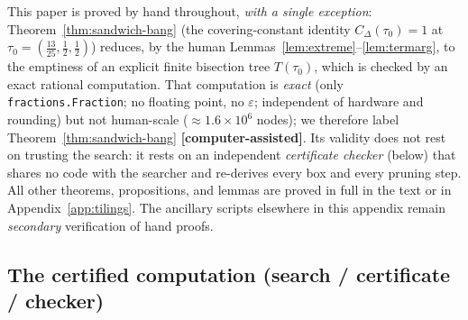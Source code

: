 
This paper is proved by hand throughout, \emph{with a single exception}:
Theorem~\ref{thm:sandwich-bang} (the covering-constant identity
$C_\Delta(\tau_0)=1$ at $\tau_0=(\tfrac{13}{25},\tfrac12,\tfrac12)$) reduces, by
the human Lemmas~\ref{lem:extreme}--\ref{lem:termarg}, to the emptiness of an
explicit finite bisection tree $T(\tau_0)$, which is checked by an exact
rational computation. That computation is \emph{exact} (only
\texttt{fractions.Fraction}; no floating point, no $\varepsilon$; independent of
hardware and rounding) but not human-scale ($\approx1.6\times10^6$ nodes); we
therefore label Theorem~\ref{thm:sandwich-bang} \textbf{[computer-assisted]}.
Its validity does not rest on trusting the search: it rests on an independent
\emph{certificate checker} (below) that shares no code with the searcher and
re-derives every box and every pruning step. All other theorems, propositions,
and lemmas are proved in full in the text or in Appendix~\ref{app:tilings}. The
ancillary scripts elsewhere in this appendix remain \emph{secondary}
verification of hand proofs.

\subsection*{The certified computation (search / certificate / checker)}

